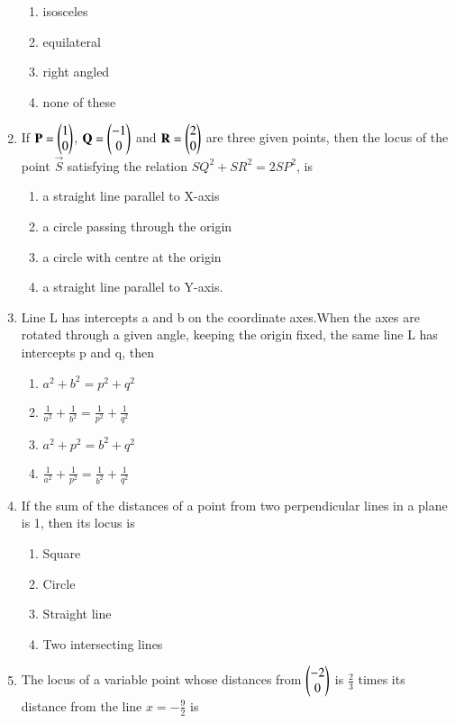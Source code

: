 \begin{enumerate}[label=\arabic*.,ref=\thesubsection.\theenumi]
\begin{enumerate}
     \item isosceles
     \item equilateral
     \item right angled
     \item none of these
     \end{enumerate}
    \item If $\mathbf{P}=\begin{pmatrix}1\\0\end{pmatrix}$, $\mathbf{Q}=\begin{pmatrix}-1\\0\end{pmatrix}$ and $\mathbf{R}=\begin{pmatrix}2\\0\end{pmatrix}$ are three given points, then the locus of the point $\vec{S}$ satisfying the relation $SQ^2+SR^2=2SP^2$, is
    \begin{enumerate}
     \item  a straight line parallel to X-axis
     \item a circle passing through the origin
     \item a circle with centre at the origin
     \item  a straight line parallel to Y-axis.
     \end{enumerate}
    \item Line L has intercepts a and b on the coordinate axes.When the axes are rotated through a given angle, keeping the origin fixed, the same line L has intercepts p and q, then
    \begin{enumerate}
     \item  $a^2+b^2=p^2+q^2$
     \item  $\frac{1}{a^2}+\frac{1}{b^2}=\frac{1}{p^2}+\frac{1}{q^2}$
     \item  $a^2+p^2=b^2+q^2$
     \item  $\frac{1}{a^2}+\frac{1}{p^2}=\frac{1}{b^2}+\frac{1}{q^2}$
     \end{enumerate}
    \item If the sum of the distances of a point from two perpendicular lines in a plane is 1, then its locus is
    \begin{enumerate}
     \item  Square
     \item  Circle
     \item  Straight line
     \item  Two intersecting lines
     \end{enumerate}
    \item The locus of a variable point whose distances from $\begin{pmatrix}-2\\0\end{pmatrix}$ is $\frac{2}{3}$ times its distance from the line $x=-\frac{9}{2}$ is

\end{enumerate}
